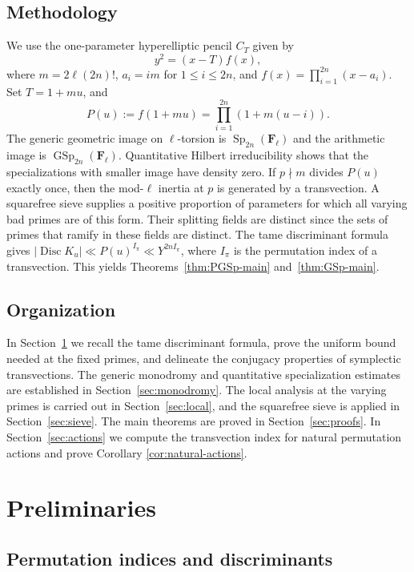 \documentclass[11pt,hidelinks]{amsart}
\newcommand{\F}{\mathbf F}
\newcommand{\GSp}{\operatorname{GSp}}
\newcommand{\Sp}{\operatorname{Sp}}
\newcommand{\Disc}{\operatorname{Disc}}
\begin{document}
\subsection{Methodology}

We use the one-parameter hyperelliptic pencil $C_T$ given by \[y^2=(x-T)f(x),\] where $m=2\ell(2n)!$, $a_i=im$ for $1\leq i\leq 2n$, and $f(x)=\prod_{i=1}^{2n}(x-a_i)$.  Set $T=1+mu$, and \[P(u):=f(1+mu)=\prod_{i=1}^{2n}(1+m(u-i)).\]
The generic geometric image on $\ell$-torsion is $\Sp_{2n}(\F_\ell)$ and the arithmetic image is $\GSp_{2n}(\F_\ell)$.  Quantitative Hilbert irreducibility shows that the specializations with smaller image have density zero. If $p\nmid m$ divides $P(u)$ exactly once, then the mod-$\ell$ inertia at $p$ is generated by a transvection. A squarefree sieve supplies a positive proportion of parameters for which all varying bad primes are of this form. Their splitting fields are distinct since the sets of primes that ramify in these fields are distinct. The tame discriminant formula gives $|\Disc K_u|\ll P(u)^{I_\pi}\ll Y^{2nI_\pi}$, where $I_\pi$ is the permutation index of a transvection. This yields Theorems~\ref{thm:PGSp-main} and~\ref{thm:GSp-main}.

\subsection{Organization}

In Section~\ref{sec:preliminaries} we recall the tame discriminant formula, prove the uniform bound needed at the fixed primes, and delineate the conjugacy properties of symplectic transvections. The generic monodromy and quantitative specialization estimates are established in Section~\ref{sec:monodromy}. The local analysis at the varying primes is carried out in Section~\ref{sec:local}, and the squarefree sieve is applied in Section~\ref{sec:sieve}. The main theorems are proved in Section~\ref{sec:proofs}. In Section~\ref{sec:actions} we compute the transvection index for natural permutation actions and prove Corollary \ref{cor:natural-actions}.

\section{Preliminaries}\label{sec:preliminaries}


\subsection{Permutation indices and discriminants}
\end{document}
